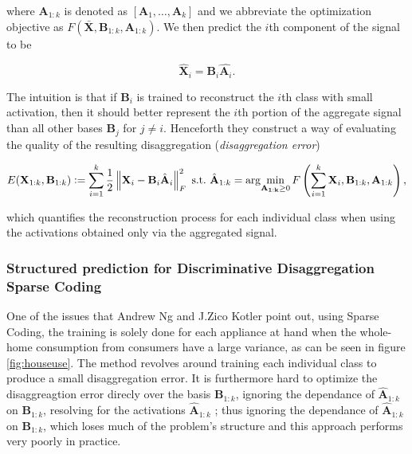 where $\mathbf{A}_{1:k}$ is denoted as $[\mathbf{A}_1,\dots,\mathbf{A}_k]$ and we abbreviate the optimization objective as $F(\bar{\mathbf{X}},\mathbf{B}_{1:k},\mathbf{A}_{1:k})$. We then predict the $i$th component of the signal to be 

\begin{equation}
\hat{\mathbf{X}}_i = \mathbf{B}_i \hat{\mathbf{A}_i}.
\end{equation}

The intuition is that if $\mathbf{B}_i$ is trained to reconstruct the $i$th class with small activation, then it should better represent the $i$th portion of the aggregate signal than all other bases $\mathbf{B}_j$ for $j\neq i$. Henceforth they construct a way of evaluating the quality of the resulting disaggregation (\textit{disaggregation error})

\begin{equation}
\label{eq:diserr}
E(\mathbf{X}_{1:k},\mathbf{B}_{1:k}) \vcentcolon= \sum_{i=1}^k \frac{1}{2} \norm{\mathbf{X}_i - \mathbf{B}_i \hat{\mathbf{A}}_i}_F^2 \ \text{s.t.} \ \hat{\mathbf{A}}_{1:k} = \arg \! \min_{\mathbf{A_{1:k}} \geq 0} F\left( \sum_{i=1}^k \mathbf{X}_i,\mathbf{B}_{1:k},\mathbf{A}_{1:k} \right),
\end{equation}

which quantifies the reconstruction process for each individual class when using the activations obtained only via the aggregated signal.

\subsubsection{Structured prediction for Discriminative Disaggregation Sparse Coding}

One of the issues that Andrew Ng and J.Zico Kotler point out, using Sparse Coding, the training is solely done for each appliance at hand when the whole-home consumption from consumers have a large variance, as can be seen in figure \ref{fig:houseuse}. The method revolves around training each individual class to produce a small disaggregation error. It is furthermore hard to optimize the disaggreagtion error direcly over the basis $\mathbf{B}_{1:k}$, ignoring the dependance of $\hat{\mathbf{A}}_{1:k}$ on $\mathbf{B}_{1:k}$, resolving for the activations  $\hat{\mathbf{A}}_{1:k}$ ; thus ignoring the dependance of $\hat{\mathbf{A}}_{1:k}$ on $\mathbf{B}_{1:k}$, which loses much of the problem's structure and this approach performs very poorly in practice.

